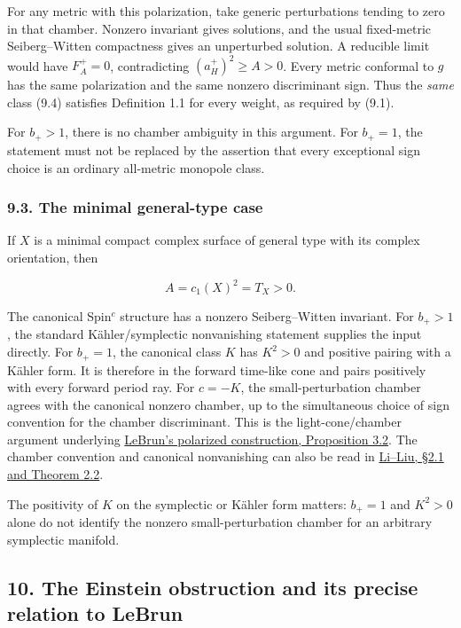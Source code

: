 \documentclass[
  10pt,
]{article}
\begin{document}
For any metric with this polarization, take generic perturbations
tending to zero in that chamber. Nonzero invariant gives solutions, and
the usual fixed-metric Seiberg--Witten compactness gives an unperturbed
solution. A reducible limit would have \(F_A^+=0\), contradicting
\((a_H^+)^2\ge A>0\). Every metric conformal to \(g\) has the same
polarization and the same nonzero discriminant sign. Thus the
\emph{same} class (9.4) satisfies Definition 1.1 for every weight, as
required by (9.1).

For \(b_+>1\), there is no chamber ambiguity in this argument. For
\(b_+=1\), the statement must not be replaced by the assertion that
every exceptional sign choice is an ordinary all-metric monopole class.

\hypertarget{the-minimal-general-type-case}{%
\subsubsection{9.3. The minimal general-type
case}\label{the-minimal-general-type-case}}

If \(X\) is a minimal compact complex surface of general type with its
complex orientation, then

\[
                          A=c_1(X)^2=T_X>0.
\]

The canonical Spin\(^c\) structure has a nonzero Seiberg--Witten
invariant. For \(b_+>1\), the standard Kähler/symplectic nonvanishing
statement supplies the input directly. For \(b_+=1\), the canonical
class \(K\) has \(K^2>0\) and positive pairing with a Kähler form. It is
therefore in the forward time-like cone and pairs positively with every
forward period ray. For \(c=-K\), the small-perturbation chamber agrees
with the canonical nonzero chamber, up to the simultaneous choice of
sign convention for the chamber discriminant. This is the
light-cone/chamber argument underlying
\href{https://arxiv.org/pdf/math/0003068}{LeBrun's polarized
construction, Proposition 3.2}. The chamber convention and canonical
nonvanishing can also be read in
\href{https://arxiv.org/pdf/math/0012048}{Li--Liu, §2.1 and Theorem
2.2}.

The positivity of \(K\) on the symplectic or Kähler form matters:
\(b_+=1\) and \(K^2>0\) alone do not identify the nonzero
small-perturbation chamber for an arbitrary symplectic manifold.

\hypertarget{the-einstein-obstruction-and-its-precise-relation-to-lebrun}{%
\subsection{10. The Einstein obstruction and its precise relation to
LeBrun}\label{the-einstein-obstruction-and-its-precise-relation-to-lebrun}}
\end{document}
